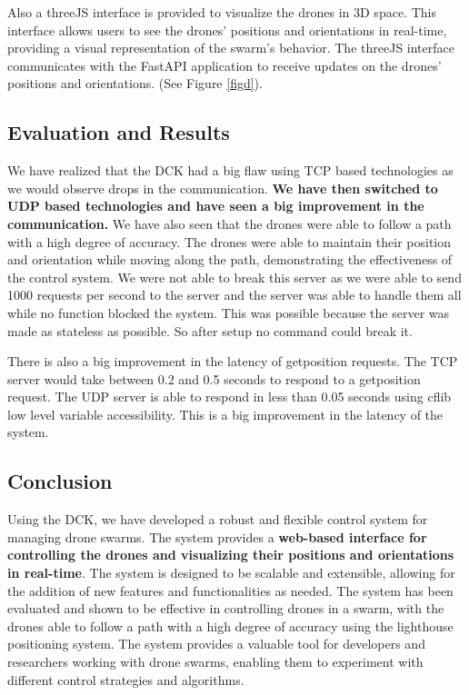 Also a \gls{threeJS} interface is provided to visualize the drones in \gls{3D} space. This interface allows users to see the drones' positions and orientations in real-time, providing a visual representation of the swarm's behavior. The \gls{threeJS} interface communicates with the \gls{FastAPI} application to receive updates on the drones' positions and orientations. (See Figure \ref{figd}).
\subsection{Evaluation and Results}

We have realized that the \gls{DCK} had a big flaw using TCP based technologies as we would observe drops in the communication. \textbf{We have then switched to UDP based technologies and have seen a big improvement in the communication.} We have also seen that the drones were able to follow a path with a high degree of accuracy. The drones were able to maintain their position and orientation while moving along the path, demonstrating the effectiveness of the control system.
We were not able to break this server as we were able to send 1000 requests per second to the server and the server was able to handle them all while no function blocked the system.
This was possible because the server was made as stateless as possible. So after setup no command could break it.

There is also a big improvement in the latency of getposition requests. The TCP server would take between 0.2 and 0.5 seconds to respond to a getposition request. The UDP server is able to respond in less than 0.05 seconds using \gls{cflib} low level variable accessibility. This is a big improvement in the latency of the system.
\subsection{Conclusion}

Using the \gls{DCK}, we have developed a robust and flexible control system for managing drone swarms. The system provides a \textbf{web-based interface for controlling the drones and visualizing their positions and orientations in real-time}. The system is designed to be scalable and extensible, allowing for the addition of new features and functionalities as needed. The system has been evaluated and shown to be effective in controlling drones in a swarm, with the drones able to follow a path with a high degree of accuracy using the \gls{lighthouse} positioning system. The system provides a valuable tool for developers and researchers working with drone swarms, enabling them to experiment with different control strategies and algorithms.
